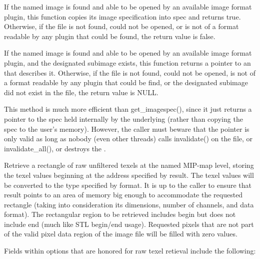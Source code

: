 
If the named image is found and able to be opened by an available
image format plugin, this function copies its image specification into
{\cf spec} and returns {\cf true}.  Otherwise, if the file is not
found, could not be opened, or is not of a format readable by any
plugin that could be found, the return value is {\cf false}.
\apiend



If the named image is found and able to be opened by an available
image format plugin, and the designated subimage exists, this function
returns a pointer to an \ImageSpec that describes it.  Otherwise, if the
file is not found, could not be opened, is not of a format readable by
any plugin that could be find, or the designated subimage did
not exist in the file, the return value is NULL.

This method is much more efficient than {\cf get_imagespec()}, since it
just returns a pointer to the spec held internally by the underlying \ImageCache
(rather than copying the spec to the user's memory).  However, the
caller must beware that the pointer is only valid as long as nobody
(even other threads) calls {\cf invalidate()} on the file, or {\cf
  invalidate_all()}, or destroys the \TextureSystem.
\apiend


Retrieve a rectangle of raw unfiltered texels at the named MIP-map level, storing
the texel values beginning at the address specified by result.
The texel values will be converted to the type specified by
format.  It is up to the caller to ensure that result points to
an area of memory big enough to accommodate the requested
rectangle (taking into consideration its dimensions, number of
channels, and data format).  The rectangular region to be
retrieved includes {\cf begin} but does not include {\cf end} (much
like STL begin/end usage).
Requested pixels that are not part of the valid pixel data region of the
image file will be filled with zero values.

Fields within {\cf options} that are honored for raw texel retieval
include the following:

